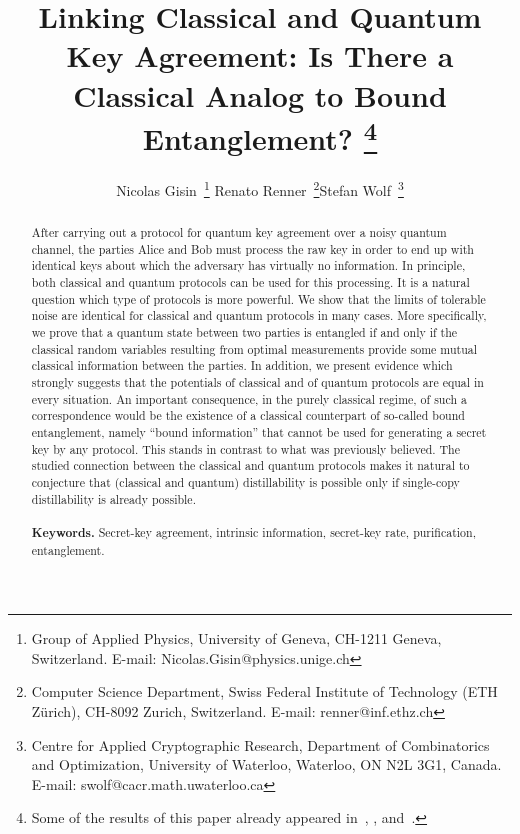 \documentclass{article}
\newcommand{\noi}{\noindent}
\begin{document}
\title{
\bf Linking Classical and Quantum Key Agreement:
 Is There a Classical Analog to Bound Entanglement?
\footnote{Some of the results of this paper already  appeared
in~\cite{giswol99}, \cite{giswol00}, and~\cite{grw00}.}}



\author{Nicolas Gisin\, \footnote{Group 
of Applied Physics, University of Geneva,
CH-1211 Geneva, Switzerland. E-mail: Nicolas.Gisin@physics.unige.ch}\qquad
Renato Renner\, \footnote{Computer Science Department, Swiss Federal 
Institute of Technology (ETH Z\"urich), CH-8092 Zurich, Switzerland.
E-mail: renner@inf.ethz.ch}\qquad Stefan Wolf\, \footnote{Centre for Applied 
Cryptographic Research,
Department of Combinatorics and Optimization,
University of Waterloo, 
Waterloo, ON N2L 3G1, Canada. E-mail:
swolf@cacr.math.uwaterloo.ca}}


\date{}







\maketitle




\begin{abstract}
\noi
After carrying out a protocol for quantum key agreement over a noisy quantum
channel, the parties Alice and Bob must process the raw key in order to 
end up with identical keys
about which 
the adversary has virtually no 
 information. 
In principle, both classical and quantum protocols can be used for this 
processing. It is a natural question which type of protocols is more 
powerful. We show that   the limits of tolerable 
noise are identical for classical and quantum protocols in many cases. 
More specifically, we prove that a quantum state between two parties
is entangled if and only if the classical random variables resulting 
from optimal measurements provide some mutual classical information 
between the parties.  
In addition, we present evidence which strongly suggests that the 
potentials
of classical and of quantum protocols are equal in every situation.
An important consequence, in the purely classical regime, of such a 
correspondence would be the existence of a classical counterpart
of so-called bound entanglement, namely 
``bound information'' that 
cannot be used for generating a secret key by any protocol. 
This stands in  contrast to what was previously believed.
The studied connection between the classical and
quantum protocols makes it natural to conjecture that (classical and
quantum) distillability is possible only if single-copy distillability is
already possible.
\\ \ \\
{\bf Keywords.} 
Secret-key agreement,  intrinsic  information,
 secret-key rate, purification, entanglement.
\end{abstract}
\end{document}
